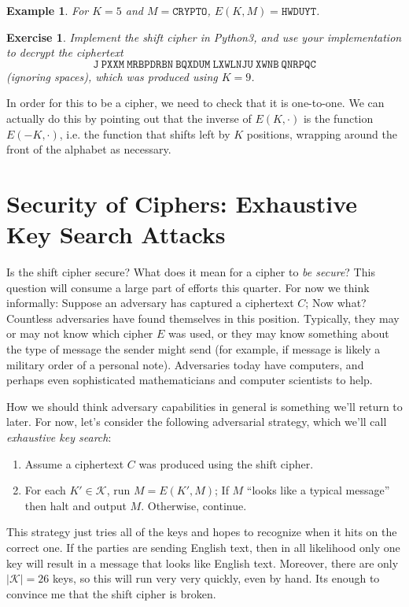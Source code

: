 \documentclass[11pt]{article}
\newtheorem{exercise}{Exercise}
\newtheorem{example}{Example}
\newcommand{\keys}{\mathcal{K}}
\newcommand{\enc}{E}
\begin{document}
\begin{example}
    For $K=5$ and $M=\mathtt{CRYPTO}$, $\enc(K,M)=\mathtt{HWDUYT}$.
\end{example}

\begin{exercise}
    Implement the shift cipher in Python3, and use your implementation
    to decrypt the ciphertext 
    \[
        \mathtt{J\ PXXM\ MRBPDRBN\ BQXDUM\ LXWLNJU\ XWNB\ QNRPQC}
    \]
    (ignoring spaces), which was produced using $K=9$.
\end{exercise}

In order for this to be a cipher, we need to check that it is one-to-one.
We can actually do this by pointing out that the inverse of $\enc(K,\cdot)$
is the function $\enc(-K,\cdot)$, i.e. the function that shifts left by
$K$ positions, wrapping around the front of the alphabet as necessary.

\section{Security of Ciphers: Exhaustive Key Search Attacks}

Is the shift cipher secure? What does it mean for a cipher to \emph{be secure}?
This question will consume a large part of efforts this quarter. For now we
think informally: Suppose an adversary has captured a ciphertext $C$; Now what?
Countless adversaries have found themselves in this position. Typically,
they may or may not know which cipher $\enc$ was used, or they may know
something about the type of message the sender might send (for example,
if message is likely a military order of a personal note). Adversaries
today have computers, and perhaps even sophisticated mathematicians and
computer scientists to help. 

How we should think adversary capabilities in general is something we'll return
to later. For now, let's consider the following adversarial strategy, which
we'll call \emph{exhaustive key search}: 
\begin{enumerate}
    \item Assume a ciphertext $C$ was produced using the shift cipher. 
        
    \item For each $K'\in\keys$, run $M = \enc(K',M)$; If $M$ ``looks like
        a typical message'' then halt and output $M$. Otherwise, continue.
\end{enumerate}
This strategy just tries all of the keys and hopes to recognize when it hits on
the correct one. If the parties are sending English text, then in all
likelihood only one key will result in a message that looks like English text.
Moreover, there are only $|\keys|=26$ keys, so this will run very very quickly,
even by hand.  Its enough to convince me that the shift cipher is broken.
\end{document}
